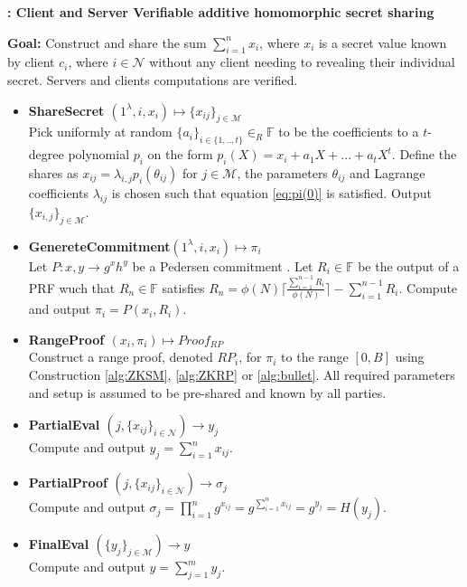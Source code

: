 \begin{algorithm}
\caption{\textbf{: Client and Server Verifiable additive homomorphic secret sharing}}

\textbf{Goal:} Construct and share the sum $\sum_{i=1}^n x_i$, where $x_i$ is a secret value known by client $c_i$, where $i\in\mathcal{N}$ without any client needing to revealing their individual secret. Servers and clients computations are verified. 
\vspace{2pt}
\hline
\vspace{2pt}
\begin{itemize}
 \item\textbf{ShareSecret $(1^\lambda,i,x_i) \mapsto \{x_{ij}\}_{j\in\mathcal{M}}$} \\
Pick uniformly at random $\{a_i\}_{i\in\{1,..,t\}}\in_R\mathds{F}$ to be the coefficients to a $t$-degree polynomial $p_i$ on the form $p_i(X) = x_i + a_1X+...+a_tX^t$. Define  the shares as $x_{ij}=\lambda_{i,j}p_i(\theta_{ij})$ for $j\in\mathcal{M}$, the parameters $\theta_{ij}$ and Lagrange coefficients $\lambda_{ij}$ is chosen such that equation \ref{eq:pi(0)} is satisfied.
Output $\{x_{i,j}\}_{j\in\mathcal{M}}$.
\item\textbf{GenereteCommitment$(1^\lambda,i,x_i) \mapsto \pi_i$ }\\
Let $P : x,y \to g^xh^y$ be a Pedersen commitment . Let $R_i\in\mathds{F}$ be the output of a PRF wuch that $R_n\in \mathds{F}$  satisfies $R_n = \phi(N)\lceil \frac{\sum_{i=1}^{n-1}R_i}{\phi(N)}\rceil- \sum_{i=1}^{n-1}R_i $. Compute and output $\pi_i = P(x_i,R_i)$.
\item\textbf{RangeProof $(x_i,\pi_i) \mapsto Proof_{RP}$}\\
Construct a range proof, denoted $RP_i$, for  $\pi_i$ to the  range $[0,B]$ using Construction \ref{alg:ZKSM}, \ref{alg:ZKRP} or \ref{alg:bullet}. All required  parameters and setup is assumed to be pre-shared and known by all parties.
\item\textbf{PartialEval $(j,\{x_{ij}\}_{i\in\mathcal{N}})\xrightarrow[]{}y_j$}\\
Compute and output $y_j = \sum_{i=1}^n x_{ij}$.

\item\textbf{PartialProof $(j,\{x_{ij}\}_{i\in\mathcal{N}})\xrightarrow[]{}\sigma_j$}\\
Compute and output $\sigma_j = \prod_{i=1}^n g^{x_{ij}} =  g^{\sum_{i=1}^n x_{ij}}= g^{y_j}=H(y_j)$.

\item\textbf{FinalEval $(\{y_j\}_{j\in\mathcal{M}})\xrightarrow[]{}y$}\\
Compute and output $y = \sum_{j=1}^m y_{j}$.


\end{itemize}
\end{algorithm}
